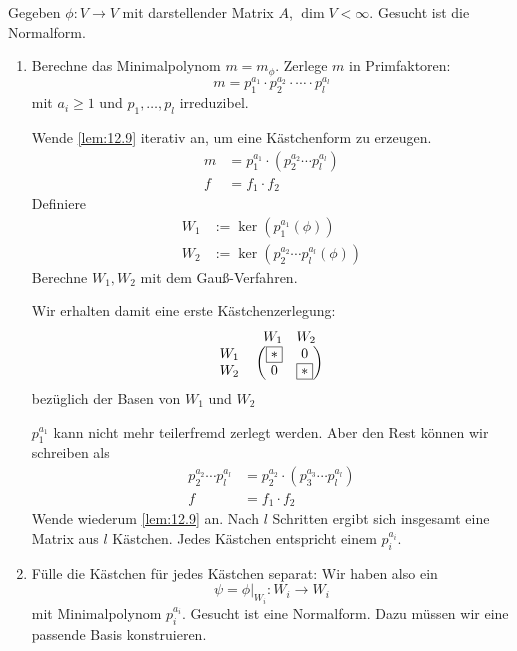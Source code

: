\documentclass{mycourse}
\begin{document}
\begin{ex}
	Gegeben $\phi: V\to V$ mit darstellender Matrix $A$, $\dim V<\infty$.
	Gesucht ist die Normalform.
	\begin{enumerate}[1{. Schritt}]
		\item
			Berechne das Minimalpolynom $m=m_\phi$.
			Zerlege $m$ in Primfaktoren:
			\[
				m = p_1^{a_1}\cdot p_2^{a_2} \cdot \dotsb \cdot p_l^{a_l}
			\]
			mit $a_i\ge 1$ und $p_1,\dotsc, p_l$ irreduzibel.

			Wende \ref{lem:12.9} iterativ an, um eine Kästchenform zu erzeugen.
			\begin{align*}
				m&=p_1^{a_1}\cdot (p_2^{a_2}\dotsb p_l^{a_l})\\
				f &= f_1\cdot f_2
			\end{align*}
			Definiere
			\begin{align*}
				W_1 &:= \ker(p_1^{a_1}(\phi))\\
				W_2 &:= \ker(p_2^{a_2}\dotsb p_l^{a_l}(\phi))
			\end{align*}
			Berechne $W_1, W_2$ mit dem Gauß-Verfahren.

			Wir erhalten damit eine erste Kästchenzerlegung:
			\[
			\begin{tabular}{*{3}{>{$}c<{$}}}
			 & \begin{matrix}
			   W_1 & W_2
			 \end{matrix} \\
			 \begin{matrix}
			   W_1 \\ W_2
			 \end{matrix} &
				\begin{pmatrix}
					\fbox{$*$} & 0 \\ 0 & \fbox{$*$}
				\end{pmatrix}
			\end{tabular}
			\]
			bezüglich der Basen von $W_1$ und $W_2$

			$p_1^{a_1}$ kann nicht mehr teilerfremd zerlegt werden.
			Aber den Rest können wir schreiben als
			\begin{align*}
				p_2^{a_2}\dotsb p_l^{a_l} &= p_2^{a_2}\cdot (p_3^{a_3}\dotsb p_l^{a_l})\\
				f &= f_1\cdot f_2
			\end{align*}
			Wende wiederum \ref{lem:12.9} an.  Nach $l$  Schritten ergibt sich insgesamt eine Matrix aus $\mathit{l}$ Kästchen.  Jedes Kästchen entspricht einem $p_i^{a_i}$.

		\item
			Fülle die Kästchen für jedes Kästchen separat:
			Wir haben also  ein
			\[
				\psi=\phi|_{W_i} : W_i \to W_i
			\]
			mit Minimalpolynom $p_i^{a_i}$.
			Gesucht ist eine Normalform.
			Dazu müssen wir eine passende Basis konstruieren.


\end{enumerate}
\end{ex}
\end{document}
